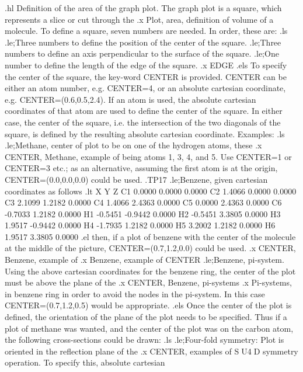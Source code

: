 .hl Definition of the area of the graph plot.
 The graph plot is a square, which represents a slice or cut through the
.x Plot, area, definition of
volume of a molecule. To define a square, seven numbers are needed. In order,
these are:
.ls
.le;Three numbers to define the position of the center of the square.
.le;Three numbers to define an axis perpendicular to the surface of the square.
.le;One number to define the length of the edge of the square.
.x EDGE
.els
 To specify the center of the square, the key-word CENTER is provided. CENTER
can be either an atom number, e.g. CENTER=4, or an absolute cartesian 
coordinate, e.g. CENTER=(0.6,0.5,2.4). If an atom is used, the absolute
cartesian coordinates of that atom are used to define the center
of the square. In either case, the center
of the square, i.e. the intersection of the two diagonals of the square,
is defined by the resulting absolute cartesian coordinate. 
 Examples:
.ls
.le;Methane, center of plot to be on one of the hydrogen atoms, these 
.x CENTER, Methane, example of
being atoms 1, 3, 4, and 5. Use CENTER=1 or CENTER=3 etc.; as an 
alternative, assuming the first atom is at the origin, CENTER=(0.0,0.0,0.0)
could be used.
.TP17
.le;Benzene, given cartesian coordinates as follows
.lt
             X         Y         Z
  C1       0.0000    0.0000    0.0000
  C2       1.4066    0.0000    0.0000
  C3       2.1099    1.2182    0.0000
  C4       1.4066    2.4363    0.0000
  C5       0.0000    2.4363    0.0000
  C6      -0.7033    1.2182    0.0000
  H1      -0.5451   -0.9442    0.0000
  H2      -0.5451    3.3805    0.0000
  H3       1.9517   -0.9442    0.0000
  H4      -1.7935    1.2182    0.0000
  H5       3.2002    1.2182    0.0000
  H6       1.9517    3.3805    0.0000
.el
then, if a plot of benzene with the center of the molecule at the middle
of the picture, CENTER=(0.7,1.2,0.0) could be used.
.x CENTER, Benzene, example of
.x Benzene, example of CENTER
.le;Benzene, pi-system. Using the above cartesian coordinates for the
benzene ring, the center of the plot must be above the plane of the
.x CENTER, Benzene, pi-systems
.x Pi-systems, in benzene
ring in order to avoid the nodes in the pi-system. In this case
CENTER=(0.7,1.2,0.5) would be appropriate.
.els
 Once the center of the plot is defined, the orientation of the plane
of the plot needs to be specified. Thus if a plot of methane was wanted,
and the center of the plot was on the carbon atom, the following 
cross-sections could be drawn:
.ls
.le;Four-fold symmetry: Plot is oriented in the reflection plane of the
.x CENTER, examples of
SU4D symmetry operation. To specify this, absolute cartesian
